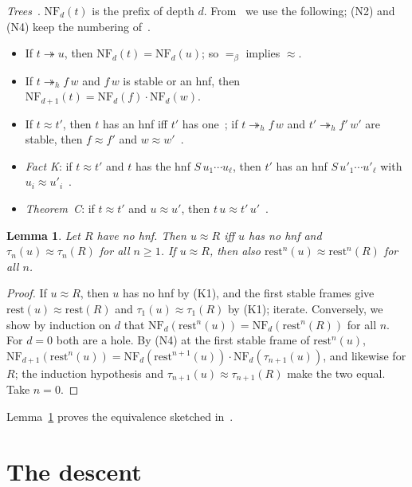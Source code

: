 \documentclass[11pt]{amsart}
\newtheorem{lemma}[theorem]{Lemma}
\theoremstyle{definition}
\newcommand{\red}{\twoheadrightarrow}
\newcommand{\hred}{\twoheadrightarrow_h}
\newcommand{\conv}{=_\beta}
\newcommand{\NF}{\mathrm{NF}}
\newcommand{\rest}{\mathrm{rest}}
\begin{document}
\emph{Trees}~\citep[\S2]{s13}. $\NF_d(t)$ is the prefix of depth $d$. From~\citep{s13} we use the
following; (N2) and (N4) keep the numbering of~\citep{s13}.
\begin{itemize}
\item[(N2)] If $t\red u$, then $\NF_d(t)=\NF_d(u)$; so $\conv$ implies $\approx$.
\item[(N4)] If $t\hred f\,w$ and $f\,w$ is stable or an hnf, then $\NF_{d+1}(t)=\NF_d(f)\cdot\NF_d(w)$.
\item[(K1)] If $t\approx t'$, then $t$ has an hnf iff $t'$ has one~\citep[Lemma~2(c)]{s13}; if $t\hred
  f\,w$ and $t'\hred f'\,w'$ are stable, then $f\approx f'$ and $w\approx
  w'$~\citep[Lemma~2(b)]{s13}.
\item[(K2)] \emph{Fact K}: if $t\approx t'$ and $t$ has the hnf $S\,u_1\cdots u_\ell$, then $t'$ has an
  hnf $S\,u'_1\cdots u'_\ell$ with $u_i\approx u'_i$~\citep[Lemma~3]{s13}.
\item[(C)] \emph{Theorem~C}: if $t\approx t'$ and $u\approx u'$, then $t\,u\approx
  t'\,u'$~\citep{s13}.
\end{itemize}

\begin{lemma}\label{lem:bot}
Let $R$ have no hnf. Then $u\approx R$ iff $u$ has no hnf and $\tau_n(u)\approx\tau_n(R)$ for all
$n\ge1$. If $u\approx R$, then also $\rest^n(u)\approx\rest^n(R)$ for all $n$.
\end{lemma}

\begin{proof}
If $u\approx R$, then $u$ has no hnf by (K1), and the first stable frames give $\rest(u)\approx\rest(R)$
and $\tau_1(u)\approx\tau_1(R)$ by (K1); iterate. Conversely, we show by induction on $d$ that
$\NF_d(\rest^n(u))=\NF_d(\rest^n(R))$ for all $n$. For $d=0$ both are a hole. By (N4) at the first
stable frame of $\rest^n(u)$,
$\NF_{d+1}(\rest^n(u))=\NF_d(\rest^{n+1}(u))\cdot\NF_d(\tau_{n+1}(u))$, and likewise for $R$; the
induction hypothesis and $\tau_{n+1}(u)\approx\tau_{n+1}(R)$ make the two equal. Take $n=0$.
\end{proof}

Lemma~\ref{lem:bot} proves the equivalence sketched in~\citep[Remark~10]{s14}.

\section{The descent}\label{sec:descent}
\end{document}
